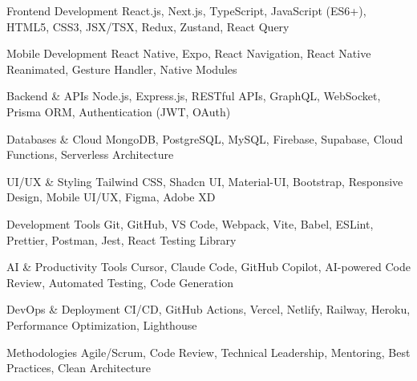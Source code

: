 

\begin{cvskills}

  \cvskill
    {Frontend Development}
    {React.js, Next.js, TypeScript, JavaScript (ES6+), HTML5, CSS3, JSX/TSX, Redux, Zustand, React Query}

  \cvskill
    {Mobile Development}
    {React Native, Expo, React Navigation, React Native Reanimated, Gesture Handler, Native Modules}

  \cvskill
    {Backend \& APIs}
    {Node.js, Express.js, RESTful APIs, GraphQL, WebSocket, Prisma ORM, Authentication (JWT, OAuth)}

  \cvskill
    {Databases \& Cloud}
    {MongoDB, PostgreSQL, MySQL, Firebase, Supabase, Cloud Functions, Serverless Architecture}

  \cvskill
    {UI/UX \& Styling}
    {Tailwind CSS, Shadcn UI, Material-UI, Bootstrap, Responsive Design, Mobile UI/UX, Figma, Adobe XD}

  \cvskill
    {Development Tools}
    {Git, GitHub, VS Code, Webpack, Vite, Babel, ESLint, Prettier, Postman, Jest, React Testing Library}

  \cvskill
    {AI \& Productivity Tools}
    {Cursor, Claude Code, GitHub Copilot, AI-powered Code Review, Automated Testing, Code Generation}

  \cvskill
    {DevOps \& Deployment}
    {CI/CD, GitHub Actions, Vercel, Netlify, Railway, Heroku, Performance Optimization, Lighthouse}

  \cvskill
    {Methodologies}
    {Agile/Scrum, Code Review, Technical Leadership, Mentoring, Best Practices, Clean Architecture}

\end{cvskills} 